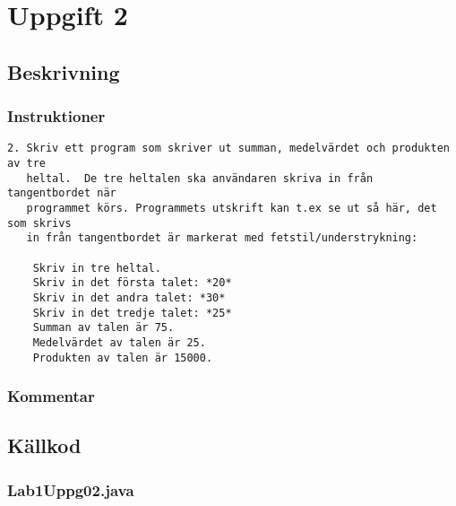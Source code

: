 \section{Uppgift 2}\label{uppgift-2}

\subsection{Beskrivning}
\subsubsection*{Instruktioner}
\begin{verbatim}
2. Skriv ett program som skriver ut summan, medelvärdet och produkten av tre
   heltal.  De tre heltalen ska användaren skriva in från tangentbordet när
   programmet körs. Programmets utskrift kan t.ex se ut så här, det som skrivs
   in från tangentbordet är markerat med fetstil/understrykning:

    Skriv in tre heltal.
    Skriv in det första talet: *20*
    Skriv in det andra talet: *30*
    Skriv in det tredje talet: *25*
    Summan av talen är 75.
    Medelvärdet av talen är 25.
    Produkten av talen är 15000.
\end{verbatim}

\subsubsection*{Kommentar}


\subsection{Källkod}\label{uppgift-2_src}
\subsubsection*{Lab1Uppg02.java}
\inputminted[]{java}{src/Lab1Uppg02.java}
